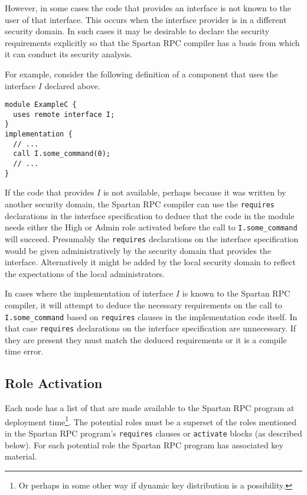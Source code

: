 However, in some cases the code that provides an interface is not known to the user of that
interface. This occurs when the interface provider is in a different security domain. In such
cases it may be desirable to declare the security requirements explicitly so that the Spartan
RPC compiler has a basis from which it can conduct its security analysis.

For example, consider the following definition of a component that uses the interface $I$
declared above.
\begin{verbatim}
module ExampleC {
  uses remote interface I;
}
implementation {
  // ...
  call I.some_command(0);
  // ...
}
\end{verbatim}

If the code that provides $I$ is not available, perhaps because it was written by another
security domain, the Spartan RPC compiler can use the \texttt{requires} declarations in the
interface specification to deduce that the code in the module needs either the High or Admin
role activated before the call to \texttt{I.some\_command} will succeed. Presumably the
\texttt{requires} declarations on the interface specification would be given administratively by
the security domain that provides the interface. Alternatively it might be added by the local
security domain to reflect the expectations of the local administrators.

In cases where the implementation of interface $I$ is known to the Spartan RPC compiler, it will
attempt to deduce the necessary requirements on the call to \texttt{I.some\_command} based on
\texttt{requires} clauses in the implementation code itself. In that case \texttt{requires}
declarations on the interface specification are unnecessary. If they are present they must match
the deduced requirements or it is a compile time error.

\subsection{Role Activation}

Each node has a list of  that are made available to the Spartan RPC
program at deployment time\footnote{Or perhaps in some other way if dynamic key distribution is
a possibility.}. The potential roles must be a superset of the roles mentioned in the Spartan
RPC program's \texttt{requires} clauses or \texttt{activate} blocks (as described below). For
each potential role the Spartan RPC program has associated key material.


